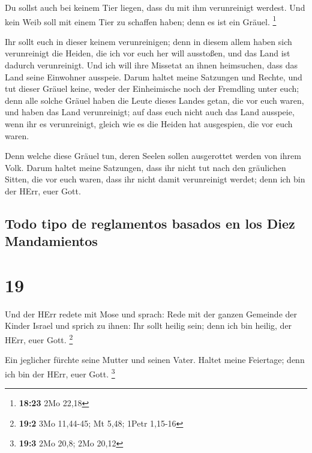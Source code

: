  Du sollst auch bei keinem Tier liegen, dass du mit ihm
verunreinigt werdest. Und kein Weib soll mit einem Tier zu schaffen
haben; denn es ist ein Gräuel. \footnote{\textbf{18:23} 2Mo 22,18}

 Ihr sollt euch in dieser keinem verunreinigen; denn in
diesem allem haben sich verunreinigt die Heiden, die ich vor euch her
will ausstoßen,  und das Land ist dadurch verunreinigt.
Und ich will ihre Missetat an ihnen heimsuchen, dass das Land seine
Einwohner ausspeie.  Darum haltet meine Satzungen und
Rechte, und tut dieser Gräuel keine, weder der Einheimische noch der
Fremdling unter euch;  denn alle solche Gräuel haben die
Leute dieses Landes getan, die vor euch waren, und haben das Land
verunreinigt;  auf dass euch nicht auch das Land
ausspeie, wenn ihr es verunreinigt, gleich wie es die Heiden hat
ausgespien, die vor euch waren.

 Denn welche diese Gräuel tun, deren Seelen sollen
ausgerottet werden von ihrem Volk.  Darum haltet meine
Satzungen, dass ihr nicht tut nach den gräulichen Sitten, die vor euch
waren, dass ihr nicht damit verunreinigt werdet; denn ich bin der HErr,
euer Gott.

\hypertarget{todo-tipo-de-reglamentos-basados-en-los-diez-mandamientos}{%
\subsection{Todo tipo de reglamentos basados \hspace{0pt}\hspace{0pt}en
los Diez
Mandamientos}\label{todo-tipo-de-reglamentos-basados-en-los-diez-mandamientos}}

\hypertarget{section-18}{%
\section{19}\label{section-18}}

 Und der HErr redete mit Mose und sprach: 
Rede mit der ganzen Gemeinde der Kinder Israel und sprich zu ihnen: Ihr
sollt heilig sein; denn ich bin heilig, der HErr, euer Gott. \footnote{\textbf{19:2}
  3Mo 11,44-45; Mt 5,48; 1Petr 1,15-16}

 Ein jeglicher fürchte seine Mutter und seinen Vater.
Haltet meine Feiertage; denn ich bin der HErr, euer Gott. \footnote{\textbf{19:3}
  2Mo 20,8; 2Mo 20,12}

